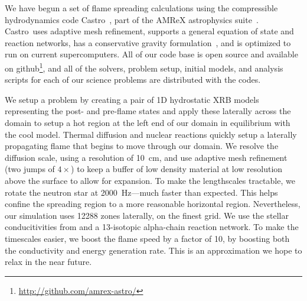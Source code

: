 \documentclass[a4paper]{jpconf}
\newcommand{\castro}{{\sffamily Castro}}
\begin{document}
We have begun a set of flame spreading calculations using the
compressible hydrodynamics code Castro~\cite{castro}, part of the
AMReX astrophysics suite~\cite{astronum:2017}.  \castro\ uses adaptive
mesh refinement, supports a general equation of state and reaction
networks, has a conservative gravity formulation~\cite{wdmergerI}, and
is optimized to run on current supercomputers.  All of our code base
is open source and available on
github\footnote{\url{http://github.com/amrex-astro/}}, and all of the
solvers, problem setup, initial models, and analysis scripts for each
of our science problems are distributed with the codes.

We setup a problem by creating a pair of 1D hydrostatic XRB models
representing the post- and pre-flame states and apply these laterally
across the domain to setup a hot region at the left end of our domain
in equilibrium with the cool model.  Thermal diffusion and nuclear
reactions quickly setup a laterally propagating flame that begins to
move through our domain.  We resolve the diffusion scale, using a
resolution of 10~cm, and use adaptive mesh refinement (two jumps of
$4\times$) to keep a buffer of low density material at low resolution
above the surface to allow for expansion.  To make the lengthscales
tractable, we rotate the neutron star at 2000~Hz---much faster than
expected.  This helps confine the spreading region to a more
reasonable horizontal region.  Nevertheless, our simulation uses 12288
zones laterally, on the finest grid.  We use the stellar
conducitivities from \cite{Timmes00} and a 13-isotopic alpha-chain
reaction network.  To make the timescales easier, we boost the flame
speed by a factor of 10, by boosting both the conductivity and energy
generation rate.  This is an approximation we hope to relax in the
near future.
\end{document}
